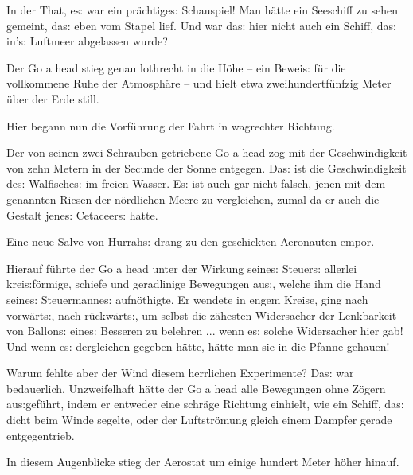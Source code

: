 \documentclass[oneside,12pt]{book}
\newenvironment{antiqua}{\normalfont}{}
\newcommand{\s}{s:}
\begin{document}
In der That, e{\s} war ein pr\"achtige{\s} Schauspiel! Man h\"atte
ein Seeschiff zu sehen gemeint, da{\s} eben vom Stapel lief. Und war
da{\s} hier nicht auch ein Schiff, da{\s} in'{\s} Luftmeer abgelassen
wurde?

Der \begin{antiqua}Go a head\end{antiqua} stieg genau lothrecht in
die H\"ohe -- ein Bewei{\s} f\"ur die vollkommene Ruhe der
Atmosph\"are -- und hielt etwa zweihundertf\"unfzig Meter \"uber der
Erde still.

Hier begann nun die Vorf\"uhrung der Fahrt in wagrechter Richtung.

Der von seinen zwei Schrauben getriebene \begin{antiqua}Go a
head\end{antiqua} zog mit der Geschwindigkeit von zehn Metern in der
Secunde der Sonne entgegen. Da{\s} ist die Geschwindigkeit de{\s}
Walfische{\s} im freien Wasser. E{\s} ist auch gar nicht falsch,
jenen mit dem genannten Riesen der n\"ordlichen Meere zu vergleichen,
zumal da er auch die Gestalt jene{\s} Cetaceer{\s} hatte.

Eine neue Salve von Hurrah{\s} drang zu den geschickten Aeronauten
empor.

Hierauf f\"uhrte der \begin{antiqua}Go a head\end{antiqua} unter der
Wirkung seine{\s} Steuer{\s} allerlei krei{\s}f\"ormige, schiefe und
geradlinige Bewegungen au{\s}, welche ihm die Hand seine{\s}
Steuermanne{\s} aufn\"othigte. Er wendete in engem Kreise, ging nach
vorw\"art{\s}, nach r\"uckw\"art{\s}, um selbst die z\"ahesten
Widersacher der Lenkbarkeit von Ballon{\s} eine{\s} Besseren zu
belehren ... wenn e{\s} solche Widersacher hier gab! Und wenn e{\s}
dergleichen gegeben h\"atte, h\"atte man sie in die Pfanne gehauen!

Warum fehlte aber der Wind diesem herrlichen Experimente? Da{\s} war
bedauerlich. Unzweifelhaft h\"atte der \begin{antiqua}Go a
head\end{antiqua} alle Bewegungen ohne Z\"ogern au{\s}gef\"uhrt,
indem er entweder eine schr\"age Richtung einhielt, wie ein Schiff,
da{\s} dicht beim Winde segelte, oder der Luftstr\"omung gleich einem
Dampfer gerade entgegentrieb.

In diesem Augenblicke stieg der Aerostat um einige hundert Meter
h\"oher hinauf.
\end{document}
